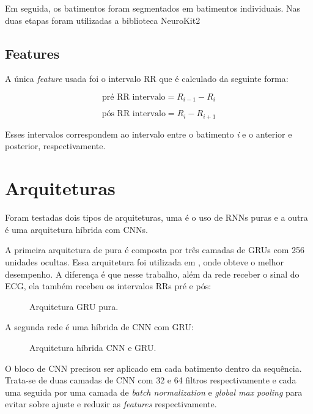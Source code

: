 Em seguida, os batimentos foram segmentados em batimentos individuais. Nas duas etapas foram utilizadas a biblioteca NeuroKit2 \cite{Makowski2021neurokit}

\subsection{Features}

A única \textit{feature} usada foi o intervalo RR que é calculado da seguinte forma: 

\begin{equation}
\text{pré RR intervalo} = R_{i-1} - R_{i}
\end{equation}

\begin{equation}
\text{pós RR intervalo} = R_{i} - R_{i+1}
\end{equation}

Esses intervalos correspondem ao intervalo entre o batimento \textit{i} e o anterior e posterior, respectivamente.

\section{Arquiteturas}
\label{sec:modelos}

Foram testadas dois tipos de arquiteturas, uma é o uso de RNNs puras e a outra é uma arquitetura híbrida com CNNs. 

A primeira arquitetura de pura é composta por três camadas de GRUs com 256 unidades ocultas. Essa arquitetura foi utilizada em , onde obteve o melhor desempenho. 
A diferença é que nesse trabalho, além da rede receber o sinal do ECG, ela também recebeu os intervalos RRs pré e pós:


\begin{figure}[H]
  \centering
  \caption{Arquitetura GRU pura.}
  \label{fig:gru_pura}
\end{figure}

A segunda rede é uma híbrida de CNN com GRU:

\begin{figure}[H]
  \centering
  \caption{Arquitetura híbrida CNN e GRU.}
  \label{fig:cnn_gru}
\end{figure}

O bloco de CNN precisou ser aplicado em cada batimento dentro da sequência. Trata-se de duas camadas de CNN com 32 e 64 filtros respectivamente e cada 
uma seguida por uma camada de \textit{batch normalization} e \textit{global max pooling} para evitar sobre ajuste e reduzir as \textit{features} respectivamente.

